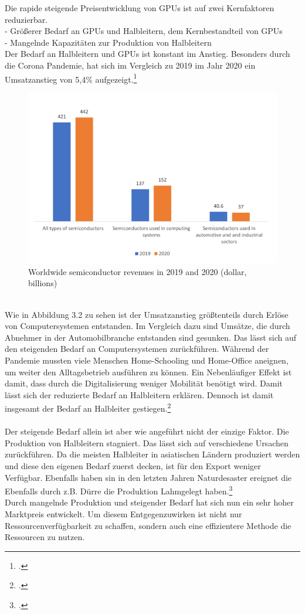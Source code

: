 \documentclass[12pt,toc=bib,toc=listof]{scrreprt}
\begin{document}
Die rapide steigende Preisentwicklung von GPUs ist auf zwei Kernfaktoren reduzierbar.\\
- Größerer Bedarf an GPUs und Halbleitern, dem Kernbestandteil von GPUs\\ %
- Mangelnde Kapazitäten zur Produktion von Halbleitern\\
Der Bedarf an Halbleitern und GPUs ist konstant im Anstieg. Besonders durch die Corona Pandemie,
hat sich im Vergleich zu 2019 im Jahr 2020 ein Umsatzanstieg von 5,4\% aufgezeigt.\footcite [Vgl.] []{Voas.2021}
\begin{figure}[h]
  \centering
  \includegraphics[scale=0.9]{Abbildungen/voas1.png} %
  \caption[Voas, Kshetri und DeFranco (2021)]{Worldwide semiconductor revenues in 2019 and 2020 (dollar, billions)}
\end{figure}
\\Wie in Abbildung 3.2 zu sehen ist der Umsatzanstieg größtenteils durch Erlöse von Computersystemen entstanden.
Im Vergleich dazu sind Umsätze, die durch Abnehmer in der Automobilbranche entstanden sind gesunken.
Das lässt sich auf den steigenden Bedarf an Computersystemen zurückführen. Während der Pandemie mussten
viele Menschen Home-Schooling und Home-Office aneignen, um weiter den Alltagsbetrieb ausführen zu können.
Ein Nebenläufiger Effekt ist damit, dass durch die Digitalisierung weniger Mobilität benötigt wird.
Damit lässt sich der reduzierte Bedarf an Halbleitern erklären. Dennoch ist damit insgesamt der Bedarf an 
Halbleiter gestiegen.\footcite [Vgl.] []{Voas.2021}
\\\\ Der steigende Bedarf allein ist aber wie angeführt nicht der einzige Faktor. Die Produktion 
von Halbleitern stagniert. Das lässt sich auf verschiedene Ursachen zurückführen. Da die meisten 
Halbleiter in asiatischen Ländern produziert werden und diese den eigenen Bedarf zuerst decken, ist 
für den Export weniger Verfügbar. Ebenfalls haben sin in den letzten Jahren Naturdesaster ereignet die
Ebenfalls durch z.B. Dürre die Produktion Lahmgelegt haben.\footcite [Vgl.] []{Voas.2021}
\\
Durch mangelnde Produktion und steigender Bedarf hat sich nun ein sehr hoher Marktpreis entwickelt. 
Um diesem Entgegenzuwirken ist nicht nur Ressourcenverfügbarkeit zu schaffen, sondern auch eine effizientere Methode
die Ressourcen zu nutzen.
\end{document}
